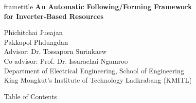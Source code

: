 \documentclass{beamer}
\begin{document}
\begin{frame}[plain]
\centering
\vspace{0.75cm}
\begin{beamercolorbox}[wd=0.86\paperwidth,sep=0.22cm,center]{frametitle}
{\Large\bfseries An Automatic Following/Forming Framework\\for Inverter-Based Resources}
\end{beamercolorbox}
\vspace{0.60cm}
{\fontsize{10.5}{13}\selectfont
Phichitchai Jueajan\\
Pakkapol Phdungdan\\[0.20cm]
Advisor: Dr. Tossaporn Surinkaew\\
Co-advisor: Prof. Dr. Issarachai Ngamroo\\[0.45cm]
Department of Electrical Engineering, School of Engineering\\
King Mongkut's Institute of Technology Ladkrabang (KMITL)
}
\end{frame}

\setlength{\abovedisplayskip}{5pt}
\setlength{\belowdisplayskip}{5pt}
\begin{frame}{Table of Contents}
\tableofcontents
\end{frame}
\end{document}
